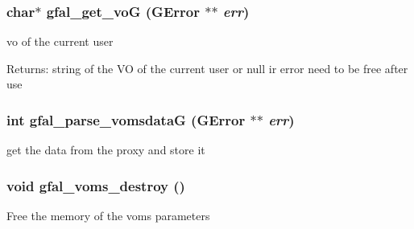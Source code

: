 \subsubsection{\setlength{\rightskip}{0pt plus 5cm}char$\ast$ gfal\_\-get\_\-vo\-G (GError $\ast$$\ast$ {\em err})}\label{gfal__voms__if_8c_04de197cd3250df8552015a45d0c7d24}


vo of the current user 

\begin{Desc}
\item[Returns:]string of the VO of the current user or null ir error need to be free after use \end{Desc}
\subsubsection{\setlength{\rightskip}{0pt plus 5cm}int gfal\_\-parse\_\-vomsdata\-G (GError $\ast$$\ast$ {\em err})}\label{gfal__voms__if_8c_fad846d1ae353ebf568469b4d15cab50}


get the data from the proxy and store it 
\subsubsection{\setlength{\rightskip}{0pt plus 5cm}void gfal\_\-voms\_\-destroy ()}\label{gfal__voms__if_8c_9de3601afd94fd770915aa29c0ed34b1}


Free the memory of the voms parameters 